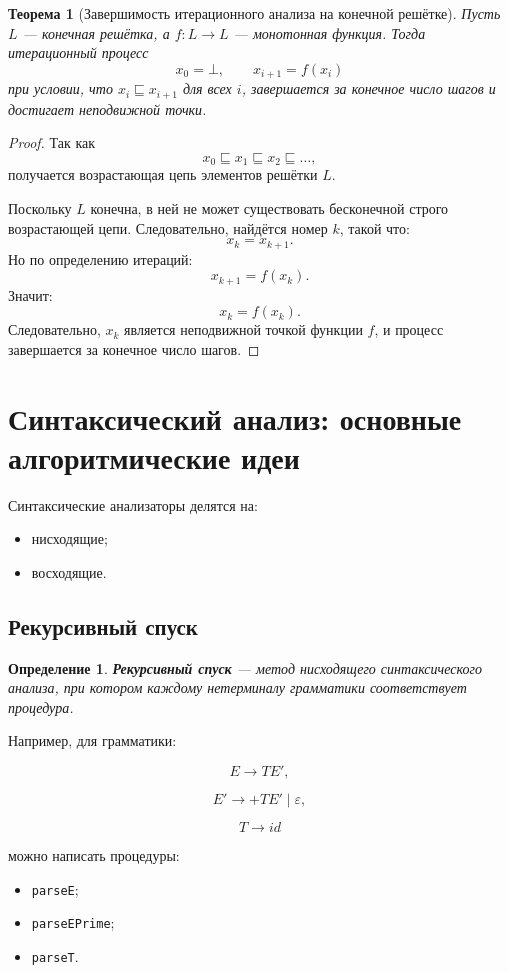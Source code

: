 \documentclass[12pt,a4paper]{article}
\newtheorem{theorem}{Теорема}
\newtheorem{definition}{Определение}
\begin{document}
\begin{theorem}[Завершимость итерационного анализа на конечной решётке]
Пусть $L$ --- конечная решётка, а $f:L\to L$ --- монотонная функция. Тогда итерационный процесс
\[
x_0=\bot,\qquad x_{i+1}=f(x_i)
\]
при условии, что $x_i\sqsubseteq x_{i+1}$ для всех $i$, завершается за конечное число шагов и достигает неподвижной точки.
\end{theorem}

\begin{proof}
Так как
\[
x_0\sqsubseteq x_1\sqsubseteq x_2\sqsubseteq \ldots,
\]
получается возрастающая цепь элементов решётки $L$.

Поскольку $L$ конечна, в ней не может существовать бесконечной строго возрастающей цепи. Следовательно, найдётся номер $k$, такой что:
\[
x_k=x_{k+1}.
\]
Но по определению итераций:
\[
x_{k+1}=f(x_k).
\]
Значит:
\[
x_k=f(x_k).
\]
Следовательно, $x_k$ является неподвижной точкой функции $f$, и процесс завершается за конечное число шагов.
\end{proof}

\section{Синтаксический анализ: основные алгоритмические идеи}

Синтаксические анализаторы делятся на:
\begin{itemize}
    \item нисходящие;
    \item восходящие.
\end{itemize}

\subsection{Рекурсивный спуск}

\begin{definition}
\textbf{Рекурсивный спуск} --- метод нисходящего синтаксического анализа, при котором каждому нетерминалу грамматики соответствует процедура.
\end{definition}

Например, для грамматики:

\[
E \to T E',
\]

\[
E' \to + T E' \mid \varepsilon,
\]

\[
T \to id
\]

можно написать процедуры:
\begin{itemize}
    \item \texttt{parseE};
    \item \texttt{parseEPrime};
    \item \texttt{parseT}.
\end{itemize}
\end{document}
